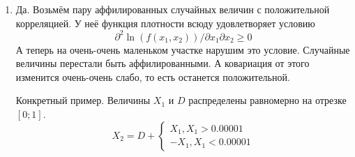 \begin{enumerate}
\item Да. Возьмём пару аффилированных случайных величин с положительной корреляцией. У неё функция плотности всюду удовлетворяет условию
\begin{equation}
\partial^{2}\ln (f(x_{1},x_{2}))/\partial x_{1}\partial x_{2} \geq 0
\end{equation}
А теперь на очень-очень маленьком участке нарушим это условие. Случайные величины перестали быть аффилированными. А ковариация от этого изменится очень-очень слабо, то есть останется положительной.

Конкретный пример. Величины $ X_{1} $  и $D$ распределены  равномерно на отрезке $ [0;1] $.
\begin{equation}
X_{2}=D+
\begin{cases}
X_{1}, X_{1}>0.00001 \\
-X_{1}, X_{1}<0.00001
\end{cases}
\end{equation}


\end{enumerate}
